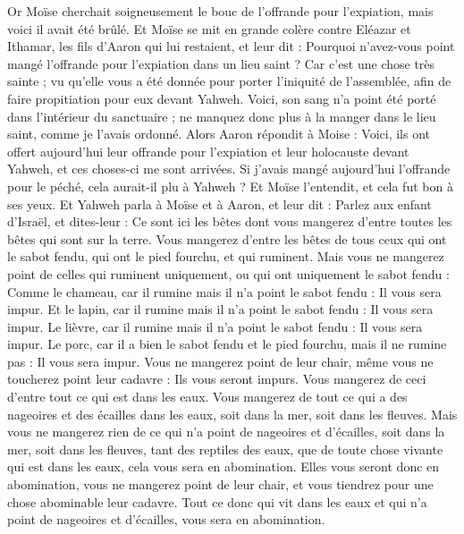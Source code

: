 \begin{multicols}{2}
Or Moïse cherchait soigneusement le bouc de l'offrande pour l'expiation, mais voici il avait été brûlé. Et Moïse se mit en grande colère contre Eléazar et Ithamar, les fils d'Aaron qui lui restaient, et leur dit :
Pourquoi n'avez-vous point mangé l'offrande pour l'expiation dans un lieu saint ? Car c'est une chose très sainte ; vu qu'elle vous a été donnée pour porter l'iniquité de l'assemblée, afin de faire propitiation pour eux devant Yahweh.
Voici, son sang n'a point été porté dans l'intérieur du sanctuaire ; ne manquez donc plus à la manger dans le lieu saint, comme je l'avais ordonné.
Alors Aaron répondit à Moise : Voici, ils ont offert aujourd'hui leur offrande pour l'expiation et leur holocauste devant Yahweh, et ces choses-ci me sont arrivées. Si j'avais mangé aujourd'hui l'offrande pour le péché, cela aurait-il plu à Yahweh ?
Et Moïse l'entendit, et cela fut bon à ses yeux.
\VerseOne{}Et Yahweh parla à Moïse et à Aaron, et leur dit :
Parlez aux enfant d'Israël, et dites-leur : Ce sont ici les bêtes dont vous mangerez d'entre toutes les bêtes qui sont sur la terre.
Vous mangerez d'entre les bêtes de tous ceux qui ont le sabot fendu, qui ont le pied fourchu, et qui ruminent.
Mais vous ne mangerez point de celles qui ruminent uniquement, ou qui ont uniquement le sabot fendu : Comme le chameau, car il rumine mais il n'a point le sabot fendu : Il vous sera impur.
Et le lapin, car il rumine mais il n'a point le sabot fendu : Il vous sera impur.
Le lièvre, car il rumine mais il n'a point le sabot fendu : Il vous sera impur.
Le porc, car il a bien le sabot fendu et le pied fourchu, mais il ne rumine pas : Il vous sera impur.
Vous ne mangerez point de leur chair, même vous ne toucherez point leur cadavre : Ils vous seront impurs.
Vous mangerez de ceci d'entre tout ce qui est dans les eaux. Vous mangerez de tout ce qui a des nageoires et des écailles dans les eaux, soit dans la mer, soit dans les fleuves.
Mais vous ne mangerez rien de ce qui n'a point de nageoires et d'écailles, soit dans la mer, soit dans les fleuves, tant des reptiles des eaux, que de toute chose vivante qui est dans les eaux, cela vous sera en abomination.
Elles vous seront donc en abomination, vous ne mangerez point de leur chair, et vous tiendrez pour une chose abominable leur cadavre.
Tout ce donc qui vit dans les eaux et qui n'a point de nageoires et d'écailles, vous sera en abomination.

\end{multicols}
